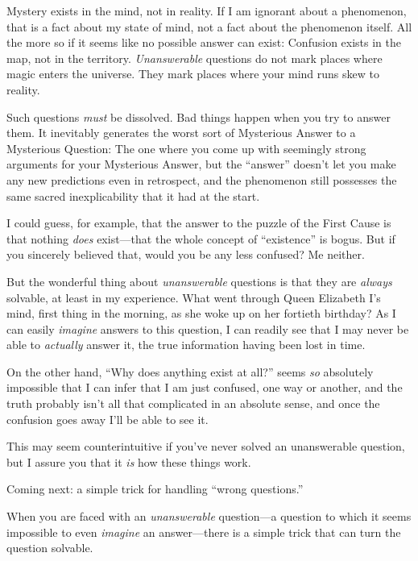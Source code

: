 {
 Mystery exists in the mind, not in reality. If I am ignorant about
a phenomenon, that is a fact about my state of mind, not a fact about
the phenomenon itself. All the more so if it seems like no possible
answer can exist: Confusion exists in the map, not in the territory.
\textit{Unanswerable} questions do not mark places where magic enters
the universe. They mark places where your mind runs skew to reality.}

{
 Such questions \textit{must} be dissolved. Bad things happen when
you try to answer them. It inevitably generates the worst sort of
Mysterious Answer to a Mysterious Question: The one where you come up
with seemingly strong arguments for your Mysterious Answer, but the
``answer'' doesn't
let you make any new predictions even in retrospect, and the phenomenon
still possesses the same sacred inexplicability that it had at the
start.}

{
 I could guess, for example, that the answer to the puzzle of the
First Cause is that nothing \textit{does} exist---that the whole
concept of ``existence'' is bogus.
But if you sincerely believed that, would you be any less confused? Me
neither.}

{
 But the wonderful thing about \textit{unanswerable} questions is
that they are \textit{always} solvable, at least in my experience. What
went through Queen Elizabeth I's mind, first thing in
the morning, as she woke up on her fortieth birthday? As I can easily
\textit{imagine} answers to this question, I can readily see that I may
never be able to \textit{actually} answer it, the true information
having been lost in time.}

{
 On the other hand, ``Why does anything exist at
all?'' seems \textit{so} absolutely impossible that I
can infer that I am just confused, one way or another, and the truth
probably isn't all that complicated in an absolute
sense, and once the confusion goes away I'll be able to
see it.}

{
 This may seem counterintuitive if you've never
solved an unanswerable question, but I assure you that it \textit{is}
how these things work.}

{
 Coming next: a simple trick for handling ``wrong
questions.''}

\myendsectiontext


{
 When you are faced with an \textit{unanswerable} question---a
question to which it seems impossible to even \textit{imagine} an
answer---there is a simple trick that can turn the question solvable. }

